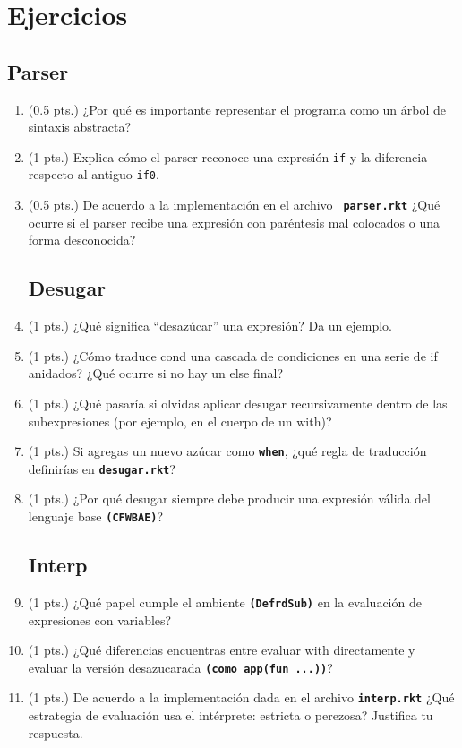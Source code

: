 \documentclass[11pt]{article}
\begin{document}
\section{Ejercicios}
\subsection{Parser}
\begin{enumerate}
    \item (0.5 pts.) ¿Por qué es importante representar el programa como un árbol de sintaxis abstracta?
    \item (1 pts.) Explica cómo el parser reconoce una expresión \texttt{if} y la diferencia respecto al antiguo \texttt{if0}.
    \item (0.5 pts.) De acuerdo a la implementación en el archivo \texttt{ \textbf{parser.rkt}} ¿Qué ocurre si el parser recibe una expresión con paréntesis mal colocados o una forma desconocida?
    \subsection{Desugar}
    \item (1 pts.) ¿Qué significa “desazúcar” una expresión? Da un ejemplo.
    \item (1 pts.) ¿Cómo traduce cond una cascada de condiciones en una serie de if anidados? ¿Qué ocurre si no hay un else final?
    \item (1 pts.) ¿Qué pasaría si olvidas aplicar desugar recursivamente dentro de las subexpresiones (por ejemplo, en el cuerpo de un with)?
    \item (1 pts.) Si agregas un nuevo azúcar como \texttt{\textbf{when}}, ¿qué regla de traducción definirías en \texttt{\textbf{desugar.rkt}}?
    \item (1 pts.) ¿Por qué desugar siempre debe producir una expresión válida del lenguaje base \texttt{\textbf{(CFWBAE)}}?
    \subsection{Interp}
    \item (1 pts.) ¿Qué papel cumple el ambiente \texttt{\textbf{(DefrdSub)}} en la evaluación de expresiones con variables?
    \item (1 pts.) ¿Qué diferencias encuentras entre evaluar with directamente y evaluar la versión desazucarada \texttt{\textbf{(como app(fun ...))}}?
    \item (1 pts.) De acuerdo a la implementación dada en el archivo \texttt{\textbf{interp.rkt}} ¿Qué estrategia de evaluación usa el intérprete: estricta o perezosa? Justifica tu respuesta.
\end{enumerate}
\end{document}
